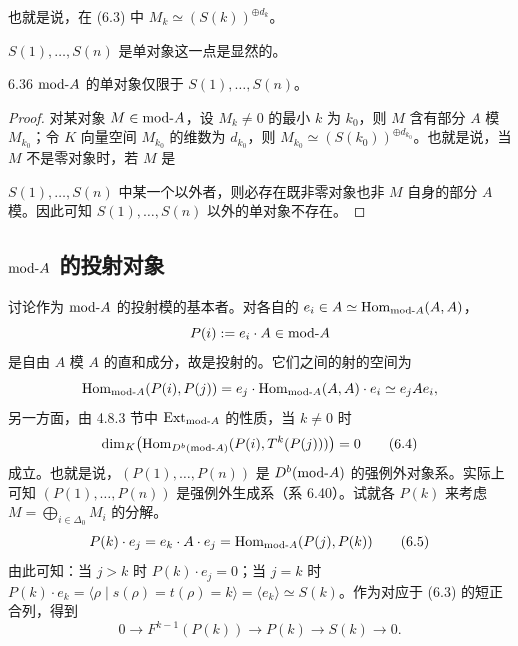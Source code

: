 也就是说，在 (6.3) 中 $M_k\simeq(S(k))^{\oplus d_k}$。

$S(1),\dots,S(n)$ 是单对象这一点是显然的。

\begin{lemma}{6.36}
$\mathrm{mod}\text{-}A$ 的单对象仅限于 $S(1),\dots,S(n)$。
\end{lemma}

\begin{proof}
对某对象 $M\in\mathrm{mod}\text{-}A$，设 $M_k\neq 0$ 的最小 $k$ 为 $k_0$，则 $M$ 含有部分 $A$ 模 $M_{k_0}$；令 $K$ 向量空间 $M_{k_0}$ 的维数为 $d_{k_0}$，则 $M_{k_0}\simeq(S(k_0))^{\oplus d_{k_0}}$。也就是说，当 $M$ 不是零对象时，若 $M$ 是

$S(1),\dots,S(n)$ 中某一个以外者，则必存在既非零对象也非 $M$ 自身的部分 $A$ 模。因此可知 $S(1),\dots,S(n)$ 以外的单对象不存在。
\end{proof}

\subsection{$\mathrm{mod}\text{-}A$ 的投射对象}

讨论作为 $\mathrm{mod}\text{-}A$ 的投射模的基本者。对各自的 $e_i\in A\simeq\operatorname{Hom}_{\mathrm{mod}\text{-}A}(A,A)$，
\[
P(i):=e_i\cdot A\in\mathrm{mod}\text{-}A
\]
是自由 $A$ 模 $A$ 的直和成分，故是投射的。它们之间的射的空间为
\[
\operatorname{Hom}_{\mathrm{mod}\text{-}A}(P(i),P(j))=e_j\cdot\operatorname{Hom}_{\mathrm{mod}\text{-}A}(A,A)\cdot e_i\simeq e_jAe_i,
\]
另一方面，由 4.8.3 节中 $\operatorname{Ext}_{\mathrm{mod}\text{-}A}$ 的性质，当 $k\neq 0$ 时
\begin{equation}
\dim_K\bigl(\operatorname{Hom}_{D^{b}(\mathrm{mod}\text{-}A)}(P(i),T^{k}(P(j)))\bigr)=0 \tag{6.4}
\end{equation}
成立。也就是说，$(P(1),\dots,P(n))$ 是 $D^{b}(\mathrm{mod}\text{-}A)$ 的强例外对象系。实际上可知 $(P(1),\dots,P(n))$ 是强例外生成系（系 6.40）。试就各 $P(k)$ 来考虑 $M=\bigoplus_{i\in\Delta_0}M_i$ 的分解。
\begin{equation}
P(k)\cdot e_j=e_k\cdot A\cdot e_j=\operatorname{Hom}_{\mathrm{mod}\text{-}A}(P(j),P(k)) \tag{6.5}
\end{equation}
由此可知：当 $j>k$ 时 $P(k)\cdot e_j=0$；当 $j=k$ 时 $P(k)\cdot e_k=\langle\rho\mid s(\rho)=t(\rho)=k\rangle=\langle e_k\rangle\simeq S(k)$。作为对应于 (6.3) 的短正合列，得到
\begin{equation}
0\to F^{k-1}(P(k))\to P(k)\to S(k)\to 0. \tag{6.6}
\end{equation}


